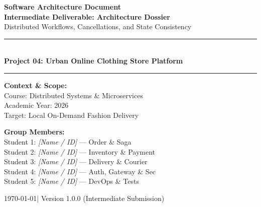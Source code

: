 \documentclass[11pt,a4paper]{article}
\begin{document}
\begin{titlepage}
    \centering
    \vspace*{1.5cm}
    
    {\Huge \bfseries \color{primary} Software Architecture Document}\\[0.4cm]
    {\Large \bfseries \color{secondary} Intermediate Deliverable: Architecture Dossier}\\[0.2cm]
    {\large Distributed Workflows, Cancellations, and State Consistency}
    
    \vspace{1.2cm}
    \rule{\linewidth}{1.2pt}\\[0.4cm]
    {\LARGE \textbf{Project 04: Urban Online Clothing Store Platform}}\\[0.2cm]
    \rule{\linewidth}{1.2pt}
    
    \vspace{2cm}
    \begin{minipage}{0.48\textwidth}
        \textbf{Context \& Scope:}\\
        Course: Distributed Systems \& Microservices\\
        Academic Year: 2026\\
        Target: Local On-Demand Fashion Delivery
    \end{minipage}
    \hfill
    \begin{minipage}{0.48\textwidth}
        \begin{flushright}
            \textbf{Group Members:}\\
            Student 1: \textit{[Name / ID]} --- Order \& Saga\\
            Student 2: \textit{[Name / ID]} --- Inventory \& Payment\\
            Student 3: \textit{[Name / ID]} --- Delivery \& Courier\\
            Student 4: \textit{[Name / ID]} --- Auth, Gateway \& Sec\\
            Student 5: \textit{[Name / ID]} --- DevOps \& Tests
        \end{flushright}
    \end{minipage}

    \vfill
    {\small \today \quad | \quad Version 1.0.0 (Intermediate Submission)}
\end{titlepage}

\tableofcontents
\newpage

\end{document}
